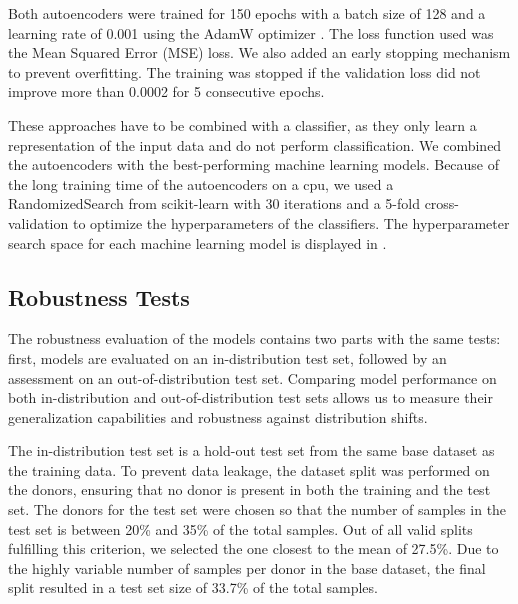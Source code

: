\documentclass[11pt]{article}
\begin{document}
Both autoencoders were trained for 150 epochs with a batch size of 128 and a learning rate of 0.001 using the AdamW optimizer \cite{loshchilov2018decoupled}. The loss function used was the Mean Squared Error (MSE) loss. We also added an early stopping mechanism to prevent overfitting. The training was stopped if the validation loss did not improve more than 0.0002 for 5 consecutive epochs. %

These approaches have to be combined with a classifier, as they only learn a representation of the input data and do not perform classification. We combined the autoencoders with the best-performing machine learning models.
Because of the long training time of the autoencoders on a cpu, we used a RandomizedSearch from scikit-learn \cite{sklearn} with 30 iterations and a 5-fold cross-validation to optimize the hyperparameters of the classifiers. The hyperparameter search space for each machine learning model is displayed in .


\subsection{Robustness Tests}\label{sec:methods:robustness-tests}

The robustness evaluation of the models contains two parts with the same tests: first, models are evaluated on an in-distribution test set, followed by an assessment on an out-of-distribution test set. Comparing model performance on both in-distribution and out-of-distribution test sets allows us to measure their generalization capabilities and robustness against distribution shifts. %

The in-distribution test set is a hold-out test set from the same base dataset as the training data. To prevent data leakage, the dataset split was performed on the donors, ensuring that no donor is present in both the training and the test set. The donors for the test set were chosen so that the number of samples in the test set is between 20\% and 35\% of the total samples. Out of all valid splits fulfilling this criterion, we selected the one closest to the mean of 27.5\%. Due to the highly variable number of samples per donor in the base dataset, the final split resulted in a test set size of 33.7\% of the total samples.
\end{document}

